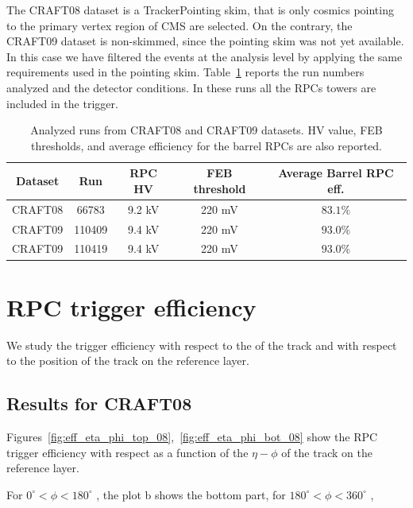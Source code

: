 The CRAFT08 dataset is a TrackerPointing skim, that is 
only cosmics pointing to the primary vertex 
region of CMS are selected. 
On the contrary, the CRAFT09 dataset is non-skimmed, 
since the pointing skim was not yet 
available. In this case we have filtered the 
events at the analysis level by applying the same
requirements used in the pointing skim.
Table~\ref{tab:runs} reports the run numbers analyzed and the detector
conditions. In these runs all the RPCs towers are included in the trigger.

 \begin{table}[htb]
    \begin{center}
      \begin{tabular}{|c|c|c|c|c|} \hline
Dataset & Run   & RPC HV & FEB threshold & Average Barrel RPC eff.\\ \hline
CRAFT08 & 66783 & 9.2 kV & 220 mV & $83.1\%$ \\ \hline
CRAFT09 & 110409  & 9.4 kV & 220 mV & $93.0\%$ \\ \hline
CRAFT09 & 110419  & 9.4 kV & 220 mV & $93.0\%$ \\ \hline
      \end{tabular}
      \caption{Analyzed runs from CRAFT08 
and CRAFT09 datasets. HV value, FEB thresholds, and average
efficiency for the barrel RPCs are also reported.}
    \label{tab:runs}
    \end{center}
  \end{table}

\section{RPC trigger efficiency}
We study the trigger efficiency with respect to the \pt of the track and 
with respect to the position of the track on the reference layer.

\subsection{Results for CRAFT08}
Figures~\ref{fig:eff_eta_phi_top_08},~\ref{fig:eff_eta_phi_bot_08} show 
the RPC trigger efficiency with respect as a function of the $\eta - \phi$
of the track on the reference layer. 

For $ 0^\circ < \phi < 180^\circ $ , 
the plot b shows the bottom part,
for  $ 180^\circ < \phi < 360^\circ $ , 


